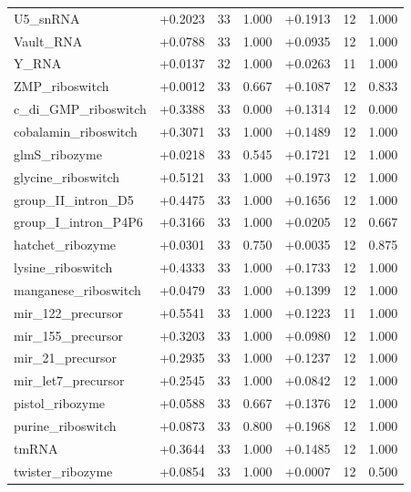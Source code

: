 \documentclass[11pt]{article}
\begin{document}
\begin{longtable}{@{}lrrrrrr@{}}
U5\_snRNA & +0.2023 & 33 & 1.000 & +0.1913 & 12 & 1.000 \\
Vault\_RNA & +0.0788 & 33 & 1.000 & +0.0935 & 12 & 1.000 \\
Y\_RNA & +0.0137 & 32 & 1.000 & +0.0263 & 11 & 1.000 \\
ZMP\_riboswitch & +0.0012 & 33 & 0.667 & +0.1087 & 12 & 0.833 \\
c\_di\_GMP\_riboswitch & +0.3388 & 33 & 0.000 & +0.1314 & 12 & 0.000 \\
cobalamin\_riboswitch & +0.3071 & 33 & 1.000 & +0.1489 & 12 & 1.000 \\
glmS\_ribozyme & +0.0218 & 33 & 0.545 & +0.1721 & 12 & 1.000 \\
glycine\_riboswitch & +0.5121 & 33 & 1.000 & +0.1973 & 12 & 1.000 \\
group\_II\_intron\_D5 & +0.4475 & 33 & 1.000 & +0.1656 & 12 & 1.000 \\
group\_I\_intron\_P4P6 & +0.3166 & 33 & 1.000 & +0.0205 & 12 & 0.667 \\
hatchet\_ribozyme & +0.0301 & 33 & 0.750 & +0.0035 & 12 & 0.875 \\
lysine\_riboswitch & +0.4333 & 33 & 1.000 & +0.1733 & 12 & 1.000 \\
manganese\_riboswitch & +0.0479 & 33 & 1.000 & +0.1399 & 12 & 1.000 \\
mir\_122\_precursor & +0.5541 & 33 & 1.000 & +0.1223 & 11 & 1.000 \\
mir\_155\_precursor & +0.3203 & 33 & 1.000 & +0.0980 & 12 & 1.000 \\
mir\_21\_precursor & +0.2935 & 33 & 1.000 & +0.1237 & 12 & 1.000 \\
mir\_let7\_precursor & +0.2545 & 33 & 1.000 & +0.0842 & 12 & 1.000 \\
pistol\_ribozyme & +0.0588 & 33 & 0.667 & +0.1376 & 12 & 1.000 \\
purine\_riboswitch & +0.0873 & 33 & 0.800 & +0.1968 & 12 & 1.000 \\
tmRNA & +0.3644 & 33 & 1.000 & +0.1485 & 12 & 1.000 \\
twister\_ribozyme & +0.0854 & 33 & 1.000 & +0.0007 & 12 & 0.500 \\
\bottomrule
\end{longtable}
\end{document}
